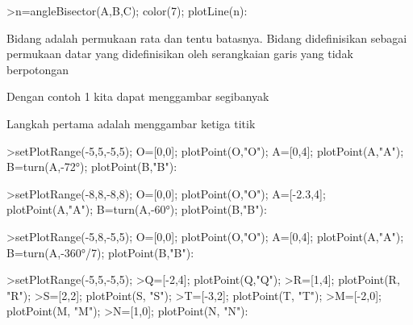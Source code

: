 \documentclass[a4paper,10pt]{article}
\begin{document}
\begin{eulernotebook}
\begin{eulercomment}
\begin{eulercomment}
\begin{eulercomment}
\end{eulercomment}
\begin{eulerprompt}
>n=angleBisector(A,B,C); color(7); plotLine(n):
\end{eulerprompt}
\begin{eulercomment}
Bidang adalah permukaan rata dan tentu batasnya. Bidang didefinisikan
sebagai permukaan datar yang didefinisikan oleh serangkaian garis yang
tidak berpotongan

Dengan contoh 1 kita dapat menggambar segibanyak

\end{eulercomment}
\begin{eulercomment}
Langkah pertama adalah menggambar ketiga titik
\end{eulercomment}
\begin{eulerprompt}
>setPlotRange(-5,5,-5,5); O=[0,0]; plotPoint(O,"O"); A=[0,4]; plotPoint(A,"A"); B=turn(A,-72°); plotPoint(B,"B"):
\end{eulerprompt}
\begin{eulerprompt}
>setPlotRange(-8,8,-8,8); O=[0,0]; plotPoint(O,"O"); A=[-2.3,4]; plotPoint(A,"A"); B=turn(A,-60°); plotPoint(B,"B"):
\end{eulerprompt}
\begin{eulerprompt}
>setPlotRange(-5,8,-5,5); O=[0,0]; plotPoint(O,"O"); A=[0,4]; plotPoint(A,"A"); B=turn(A,-360°/7); plotPoint(B,"B"):
\end{eulerprompt}
\begin{eulerprompt}
>setPlotRange(-5,5,-5,5);
>Q=[-2,4]; plotPoint(Q,"Q");
>R=[1,4]; plotPoint(R, "R");
>S=[2,2]; plotPoint(S, "S");
>T=[-3,2]; plotPoint(T, "T");
>M=[-2,0]; plotPoint(M, "M");
>N=[1,0]; plotPoint(N, "N"):
\end{eulerprompt}
\begin{eulerprompt}

\end{eulerprompt}
\end{eulercomment}
\end{eulercomment}
\end{eulernotebook}
\end{document}
